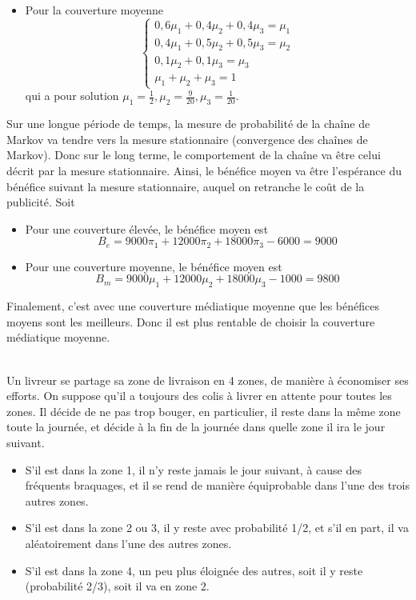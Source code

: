 \documentclass[11pt]{exam}
\begin{document}
\begin{questions}
\begin{solution}
\begin{itemize}
$$\begin{array}{l}
0,5 \pi_1 + 0,5 \pi_2 + 0,2 \pi_3 = \pi_2 \\
0,3\pi_1 + 0,4 \pi_2 + 0,7 \pi_3 = \pi_3\\
\pi_1 + \pi_2 + \pi_3 = 1
\end{array} \right.
$$
qui a pour solution $\pi_1=\frac{1}{9}, \pi_2=\frac{1}{3},
\pi_3=\frac{5}{9}$.
\item Pour la couverture moyenne
$$
\left\{ \begin{array}{l}
0,6 \mu_1 + 0,4 \mu_2 + 0,4 \mu_3 =\mu_1 \\
0,4 \mu_1 + 0,5 \mu_2 + 0,5 \mu_3 = \mu_2 \\
 0,1 \mu_2 + 0,1 \mu_3 = \mu_3\\
\mu_1 + \mu_2 + \mu_3 = 1
\end{array} \right.
$$
qui a pour solution $\mu_1=\frac{1}{2}, \mu_2=\frac{9}{20},
\mu_3=\frac{1}{20}$.
\end{itemize}
Sur une longue période de temps, la mesure de probabilité de la
chaîne de Markov va tendre vers la mesure stationnaire (convergence
des chaînes de Markov). Donc sur le long terme, le comportement de
la chaîne va être celui décrit par la mesure stationnaire. Ainsi, le
bénéfice moyen va être l'espérance du bénéfice suivant la mesure
stationnaire, auquel on retranche le coût de la publicité. Soit
\begin{itemize}
\item Pour une couverture élevée, le bénéfice moyen est
$$B_e = 9000\pi_1 + 12000 \pi_2 + 18000 \pi_3 - 6000 = 9000$$
\item Pour une couverture moyenne, le bénéfice moyen est
$$B_m = 9000\mu_1 + 12000 \mu_2 + 18000 \mu_3 - 1000 = 9800$$
\end{itemize}
Finalement, c'est avec une couverture médiatique moyenne que
les bénéfices moyens sont les meilleurs. Donc il est plus rentable
de choisir la couverture médiatique moyenne.
\end{solution}

\\
Un livreur se partage sa zone de livraison en 4 zones, de manière à économiser ses efforts. On suppose qu'il a toujours des colis à livrer en attente pour toutes les zones. Il décide de ne pas trop bouger, en particulier, il reste dans la même zone toute la journée, et décide à la fin de la journée dans quelle zone il ira  le jour suivant.
\begin{itemize}
\item S'il est dans la zone 1, il n'y reste jamais le jour suivant, à cause des fréquents braquages, et il se rend de manière équiprobable dans l'une des trois autres zones.
\item S'il est dans la zone 2 ou 3, il y reste avec probabilité 1/2, et s'il en part, il va aléatoirement dans l'une des autres zones.
\item S'il est dans la zone 4, un peu plus éloignée des autres, soit il y reste (probabilité 2/3), soit il va en zone 2.
\end{itemize}
\begin{parts}

\end{parts}
\end{questions}
\end{document}
